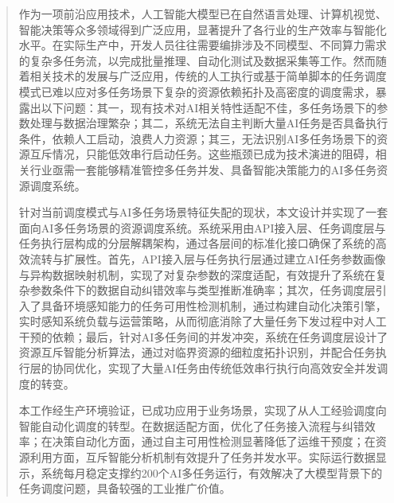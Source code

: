 

\begin{abstract}

作为一项前沿应用技术，人工智能大模型已在自然语言处理、计算机视觉、智能决策等众多领域得到广泛应用，显著提升了各行业的生产效率与智能化水平。在实际生产中，开发人员往往需要编排涉及不同模型、不同算力需求的复杂多任务流，以完成批量推理、自动化测试及数据采集等工作。然而随着相关技术的发展与广泛应用，传统的人工执行或基于简单脚本的任务调度模式已难以应对多任务场景下复杂的资源依赖拓扑及高密度的调度需求，暴露出以下问题：其一，现有技术对AI相关特性适配不佳，多任务场景下的参数处理与数据治理繁杂；其二，系统无法自主判断大量AI任务是否具备执行条件，依赖人工启动，浪费人力资源；其三，无法识别AI多任务场景下的资源互斥情况，只能低效串行启动任务。这些瓶颈已成为技术演进的阻碍，相关行业亟需一套能够精准管控多任务并发、具备智能决策能力的AI多任务资源调度系统。

针对当前调度模式与AI多任务场景特征失配的现状，本文设计并实现了一套面向AI多任务场景的资源调度系统。系统采用由API接入层、任务调度层与任务执行层构成的分层解耦架构，通过各层间的标准化接口确保了系统的高效流转与扩展性。首先，API接入层与任务执行层通过建立AI任务参数画像与异构数据映射机制，实现了对复杂参数的深度适配，有效提升了系统在复杂参数条件下的数据自动纠错效率与类型推断准确率；其次，任务调度层引入了具备环境感知能力的任务可用性检测机制，通过构建自动化决策引擎，实时感知系统负载与运营策略，从而彻底消除了大量任务下发过程中对人工干预的依赖；最后，针对AI多任务间的并发冲突，系统在任务调度层设计了资源互斥智能分析算法，通过对临界资源的细粒度拓扑识别，并配合任务执行层的协同优化，实现了大量AI任务由传统低效串行执行向高效安全并发调度的转变。

本工作经生产环境验证，已成功应用于业务场景，实现了从人工经验调度向智能自动化调度的转型。在数据适配方面，优化了任务接入流程与纠错效率；在决策自动化方面，通过自主可用性检测显著降低了运维干预度；在资源利用方面，互斥智能分析机制有效提升了任务并发水平。实际运行数据显示，系统每月稳定支撑约200个AI多任务运行，有效解决了大模型背景下的任务调度问题，具备较强的工业推广价值。

\end{abstract}

